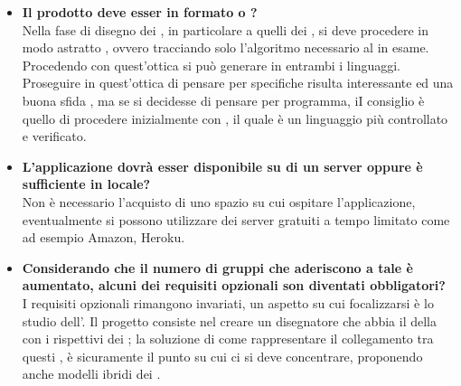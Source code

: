 \begin{itemize}
		   	 \item
	   	 \textbf{Il  prodotto deve esser in formato  o ?\\}
	   	 \justifying
	   	 Nella fase di disegno dei  , in particolare a quelli dei , si deve procedere in modo astratto , ovvero tracciando solo l'algoritmo necessario al  in esame. Procedendo con quest'ottica si può generare  in entrambi i linguaggi. Proseguire in quest'ottica di pensare per specifiche risulta interessante ed una buona sfida , ma se si decidesse di pensare per programma, iI consiglio è quello di procedere inizialmente con , il quale è un linguaggio più controllato e verificato.\\
		
		   	 \item
	   	 \textbf{L'applicazione dovrà esser disponibile su di un server oppure è sufficiente in locale?\\}
	   	\justifying
	   	 Non è necessario l'acquisto di uno spazio su cui ospitare l'applicazione, eventualmente si possono utilizzare dei server gratuiti a tempo limitato come ad esempio Amazon, Heroku.\\
		
		\item
	   	 \textbf{Considerando che il numero di gruppi che aderiscono a tale  è aumentato, alcuni dei requisiti opzionali son diventati obbligatori?\\}
	   	\justifying
	   	I requisiti opzionali rimangono invariati, un aspetto su cui focalizzarsi è lo studio dell'. Il progetto consiste nel creare un disegnatore che abbia il  della  con i rispettivi  dei ; la soluzione di come rappresentare il collegamento tra questi , è sicuramente il punto su cui ci si deve concentrare, proponendo anche modelli ibridi dei .\\
	   	 

\end{itemize}
